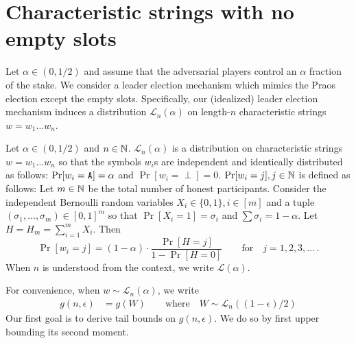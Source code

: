 





\section{Characteristic strings with no empty slots}\label{sec:Lalpha-praos}

Let $\alpha \in (0, 1/2)$ 
and assume that the adversarial players control an $\alpha$ 
fraction of the stake. 
We consider a leader election mechanism 
which mimics the Praos election except the empty slots. 
Specifically, 
our (idealized) leader election mechanism 
induces 
a distribution $\mathcal{L}_n(\alpha)$ 
on length-$n$ characteristic strings $w = w_1 \ldots w_n$. 

\begin{definition}\label{def:dist-L-alpha-praos}
  Let $\alpha \in (0,1/2)$ and $n \in \mathbb{N}$. 
  $\mathcal{L}_n(\alpha)$ is a distribution on characteristic strings 
  $w = w_1 \ldots w_n$ so that 
  the symbols $w_i$s are independent and identically distributed as follows: 
  $\Pr[w_i = \mathtt{A}] = \alpha$ and $\Pr[w_i = \perp] = 0$.
  $\Pr[w_i = j], j \in \mathbb{N}$ is defined as follows: 
  Let $m \in \mathbb{N}$ be the total number of honest participants. 
  Consider the independent Bernoulli random variables $X_i \in \{0, 1\}, i \in [m]$ 
  and a tuple $(\sigma_1, \ldots, \sigma_m) \in [0,1]^m$ 
  so that $\Pr[X_i = 1] = \sigma_i$ 
  and $\sum \sigma_i = 1 - \alpha$. 
  Let $H = H_m = \sum_{i =1}^m X_i$. 
  Then 
  $$
    \Pr[w_i = j] = (1-\alpha)\cdot
      \frac{\Pr[H = j]}{1 - \Pr[H = 0]}
      \qquad \text{for}\quad j = 1,2,3,\ldots
      \,.
  $$
  When $n$ is understood from the context, 
  we write $\mathcal{L}(\alpha)$. 
\end{definition}

For convenience, when $w \sim \mathcal{L}_n(\alpha)$, we write
\begin{align}
  g(n,\epsilon) &= g(W) \qquad \text{where} \quad W \sim \mathcal{L}_n((1-\epsilon)/2) \label{eq:praos-gneps}
\end{align}
\noindent 
Our first goal is to derive tail bounds on $g(n,\epsilon)$. 
We do so by first upper bounding its second moment.




